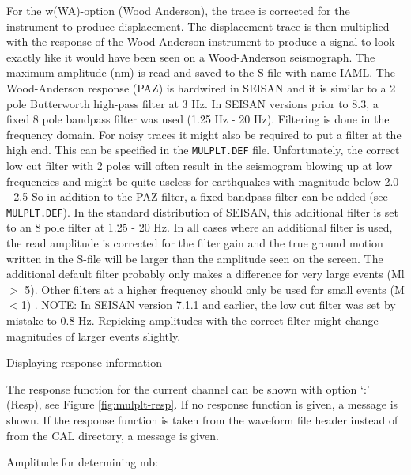 For the w(WA)-option (Wood Anderson), the trace is corrected for the instrument to produce displacement. The displacement trace is then multiplied with the response of the Wood-Anderson instrument to produce a signal to look exactly like it would have been seen on a Wood-Anderson seismograph. The maximum amplitude (nm) is read and saved to the S-file with name IAML. The Wood-Anderson response (PAZ) is hardwired in SEISAN and it is similar to a 2 pole Butterworth high-pass filter at 3 Hz.   In SEISAN versions prior to 8.3, a fixed 8 pole bandpass filter was used (1.25 Hz - 20 Hz). Filtering is done in the frequency domain. For noisy traces it might also be required to put a filter at the high end. This can be specified in the \texttt{MULPLT.DEF} file. Unfortunately, the correct low cut filter with 2 poles will often result in the seismogram blowing up at low frequencies and might be quite useless for earthquakes with magnitude below 2.0 - 2.5  So in addition to the PAZ filter, a fixed bandpass filter can be added (see \texttt{MULPLT.DEF}). In the standard distribution of SEISAN, this additional filter is set to an 8 pole filter at  1.25 - 20 Hz. In all cases where an additional filter is used, the read amplitude is corrected for the filter gain and the true ground motion written in the S-file will be larger than the amplitude seen on the screen. The additional default filter probably only makes a difference for very large events (Ml $>$ 5). Other filters at a higher frequency should only be used for small events (M$<$1) .  NOTE: In SEISAN version 7.1.1 and earlier, the low cut filter was set by mistake to 0.8 Hz. Repicking amplitudes with the correct filter might change magnitudes of larger events slightly.

Displaying response information 

The response function for the current channel can be shown with option `:' (Resp), see Figure 
\ref{fig:mulplt-resp}.
If no response function is given, a message is shown. If the response function is taken from the waveform file header instead of from the CAL directory, a message is given.  


Amplitude for determining mb: 

